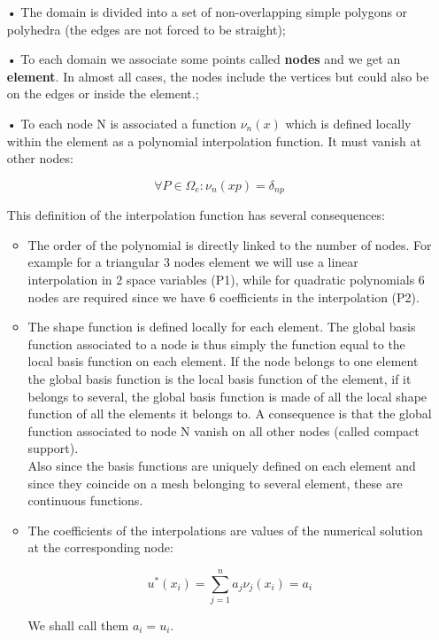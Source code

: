 \begin{itemize}
\item[•] The domain is divided into a set of non-overlapping simple polygons or polyhedra (the edges are not forced to be straight);
\item[•] To each domain we associate some points called \textbf{nodes} and we get an \textbf{element}. In almost all cases, the nodes include the vertices but could also be on the edges or inside the element.; 
\item[•] To each node N is associated a function $\nu_n (x)$ which is defined locally within the element as a polynomial interpolation function. It must vanish at other nodes: 

\begin{equation}
\forall P \in \Omega _e : \nu _n(xp) = \delta _{np}
\end{equation} 

This definition of the interpolation function has several consequences: 

\begin{itemize}
\item The order of the polynomial is directly linked to the number of nodes. For example for a triangular 3 nodes element we will use a linear interpolation in 2 space variables (P1), while for quadratic polynomials 6 nodes are required since we have 6 coefficients in the interpolation (P2). \\

\item The shape function is defined locally for each element. The global basis function associated to a node is thus simply the function equal to the local basis function on each element. If the node belongs to one element the global basis function is the local basis function of the element, if it belongs to several, the global basis function is made of all the local shape function of all the elements it belongs to. A consequence is that the global function associated to node N vanish on all other nodes (called compact support). \\

Also since the basis functions are uniquely defined on each element and since they coincide on a mesh belonging to several element, these are continuous functions. \\

\item The coefficients of the interpolations are values of the numerical solution at the corresponding node: 

\begin{equation}
u^* (x_i) = \sum _{j = 1}^n a_j \nu_j(x_i) = a_i
\end{equation}

We shall call them $a_i = u_i$. \\
\end{itemize}
\end{itemize}



